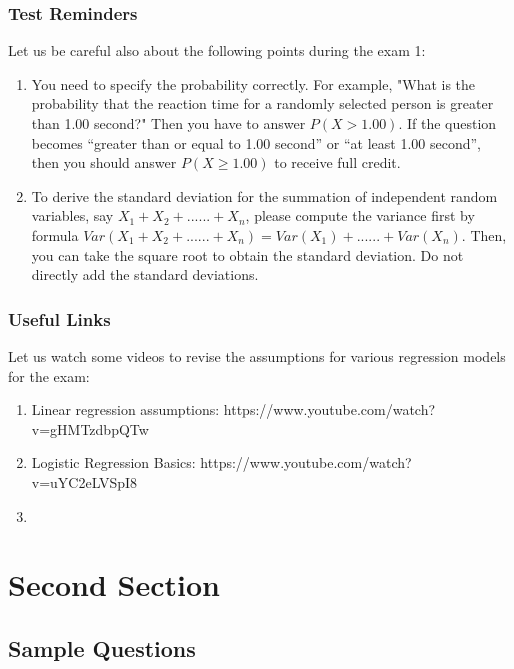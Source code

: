 \documentclass{beamer}
\begin{document}

\begin{frame}
\frametitle{Test Reminders}

Let us be careful also about the following points during the exam 1:

\begin{enumerate}
\item You need to specify the
probability correctly. For example, "What is the probability that the reaction time for a randomly selected person is greater than 1.00 second?" Then you have to answer $P(X > 1.00)$. If the question becomes “greater than or equal to 1.00 second”
or “at least 1.00 second”, then you should answer $P(X \ge 1.00)$ to receive full credit.
\item To derive the standard deviation for the summation of independent random variables, say $X_1+X_2+......+X_n$,
please compute the variance first by formula $Var(X_1 + X_2 + ...... + X_n) = Var(X_1) + ...... + Var(X_n)$.
Then, you can take the square root to obtain the standard deviation. Do not directly add the standard
deviations.

\end{enumerate}
\end{frame}

\begin{frame}
\frametitle{Useful Links}

Let us watch some videos to revise the assumptions for various regression models for the exam:

\begin{enumerate}
\item Linear regression assumptions: https://www.youtube.com/watch?v=gHMTzdbpQTw

\item Logistic Regression Basics: https://www.youtube.com/watch?v=uYC2eLVSpI8

\item
\end{enumerate}
\end{frame}



\section{Second Section}
\subsection{Sample Questions}
\end{document}
